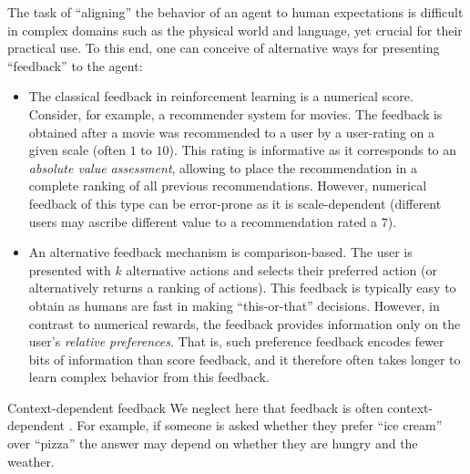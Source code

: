 \begin{marginfigure}[-10\baselineskip]
  \caption{We generalize the perspective of reinforcement learning from \cref{fig:rl} by allowing the feedback to come from either the environment or an evaluation by other agents (e.g., humans), and by allowing the feedback to come in other forms than a numerical reward.}\label{fig:learning_from_preferences}
\end{marginfigure}

The task of ``aligning'' the behavior of an agent to human expectations is difficult in complex domains such as the physical world and language, yet crucial for their practical use.
To this end, one can conceive of alternative ways for presenting ``feedback'' to the agent: \begin{itemize}

  \item The classical feedback in reinforcement learning is a numerical score.
  Consider, for example, a recommender system for movies.
  The feedback is obtained after a movie was recommended to a user by a user-rating on a given scale (often $1$ to $10$).
  This rating is informative as it corresponds to an \emph{absolute value assessment}, allowing to place the recommendation in a complete ranking of all previous recommendations.
  However, numerical feedback of this type can be error-prone as it is scale-dependent (different users may ascribe different value to a recommendation rated a $7$).

  \item An alternative feedback mechanism is comparison-based.
  The user is presented with $k$ alternative actions and selects their preferred action (or alternatively returns a ranking of actions).
  This feedback is typically easy to obtain as humans are fast in making ``this-or-that'' decisions.
  However, in contrast to numerical rewards, the feedback provides information only on the user's \emph{relative preferences}.
  That is, such preference feedback encodes fewer bits of information than score feedback, and it therefore often takes longer to learn complex behavior from this feedback.
\end{itemize}

\begin{rmk}{Context-dependent feedback}{}
  We neglect here that feedback is often context-dependent \citep{lindner2022humans,casper2023open}.
  For example, if someone is asked whether they prefer ``ice cream'' over ``pizza'' the answer may depend on whether they are hungry and the weather.
\end{rmk}


